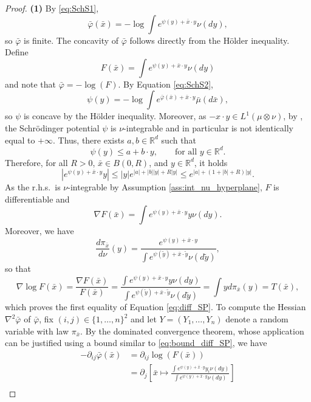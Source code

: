 \documentclass[reqno, a4paper]{amsart}
\theoremstyle{plain}
\theoremstyle{definition}
\theoremstyle{remark}
\numberwithin{equation}{section}
\numberwithin{theorem}{section}
\newcommand{\R}{\mathbb{R}}
\begin{document}
	\begin{proof}
		\textbf{(1)}  By \eqref{eq:SchS1},
		\[
			\bar\varphi(\bar x)=-\log\int e^{\psi(y)+\bar x\cdot y}\nu(dy),
		\]
		so $\bar\varphi$ is finite. The concavity of $\bar\varphi$ follows directly from the Hölder inequality. Define
		\[
			F(\bar x)=\int e^{\psi(y)+\bar x \cdot y}\nu(dy)
		\]
		and note that $\bar\varphi=-\log(F)$. By Equation \eqref{eq:SchS2},
		\[\psi(y) = -\log \int e^{\bar\varphi(\bar x)+\bar x \cdot y} \bar\mu(d \bar x),\]
		so $\psi$ is concave by the Hölder inequality. Moreover, as $-x \cdot y \in L^1(\mu \otimes \nu)$, by \cite[Theorem 4.2]{Nu22},  the Schrödinger potential $\psi$ is $\nu$-integrable and in particular is not identically equal to $+\infty$. Thus, there exists $a,b \in \R^d$ such that $$\psi(y) \leq a + b\cdot y, \qquad \text{for all } y \in \R^d.$$ Therefore, for all $R>0$, $\bar x \in B(0,R)$, and $y \in \R^d$, it holds
		\begin{equation}\label{eq:bound_diff_SP}
			|e^{\psi(y)+\bar x\cdot y}y| \leq |y| e^{|a|+ |b||y|+ R|y|} \leq e^{|a|+(1+|b|+R)|y|}.
		\end{equation}
		As the r.h.s.\ is $\nu$-integrable by Assumption \eqref{ass:int_nu_hyperplane}, $F$ is differentiable and
		\begin{equation*}
			\nabla F (\bar x) = \int e^{\psi(y)+\bar x \cdot y} y \nu(dy).
		\end{equation*}
		Moreover, we have 
		\begin{equation}
			\frac{d \pi_{\bar x}}{d \nu}(y) = \frac{e^{\psi(y)+\bar x \cdot y}}{\int e^{\psi(\tilde{y})+\bar x \cdot \tilde{y}} \nu(d\tilde{y})} ,
		\end{equation}
		so that
		$$\nabla \log F (\bar x) = \frac{\nabla F (\bar x)}{F(\bar x)}  = \frac{\int e^{\psi(y)+\bar x \cdot y} y \nu(dy)}{\int e^{\psi(\tilde{y})+\bar x \cdot \tilde{y}} \nu(d\tilde{y})} = \int y d \pi_{\bar x}(y) = T(\bar x),$$
		which proves the first equality of Equation \eqref{eq:diff_SP}. To compute the Hessian $\nabla^2 \bar\varphi$ of $\bar\varphi$, fix $(i,j) \in \{1,\dots, n\}^2$ and let $Y = (Y_1,\dots,Y_n)$ denote a random variable with law $\pi_{\bar x}$. By the  dominated convergence theorem, whose application can be justified using a bound similar to \eqref{eq:bound_diff_SP}, we have
		\begin{align*}
			-\partial_{ij} \bar\varphi (\bar x) &= \partial_{ij} \log(F(\bar x))\\
			&= \partial_j \left[ \bar x \mapsto \frac{ \int e^{\psi(y)+\bar x\cdot y} y_i \nu(dy)}{\int e^{\psi(y)+\bar x\cdot y} \nu(dy)} \right] \\

\end{align*}
\end{proof}
\end{document}
